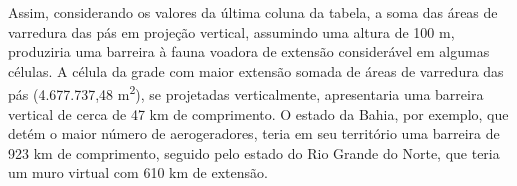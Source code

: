 \documentclass[
  oneside]{scrbook}
\begin{document}
\begin{blackbox}
Assim, considerando os valores da última coluna da tabela, a soma das áreas de varredura das pás em projeção vertical, assumindo uma altura de 100 m, produziria uma barreira à fauna voadora de extensão considerável em algumas células. A célula da grade com maior extensão somada de áreas de varredura das pás (4.677.737,48 m\textsuperscript{2}), se projetadas verticalmente, apresentaria uma barreira vertical de cerca de 47 km de comprimento. O estado da Bahia, por exemplo, que detém o maior número de aerogeradores, teria em seu território uma barreira de 923 km de comprimento, seguido pelo estado do Rio Grande do Norte, que teria um muro virtual com 610 km de extensão.

\end{blackbox}
\end{document}
